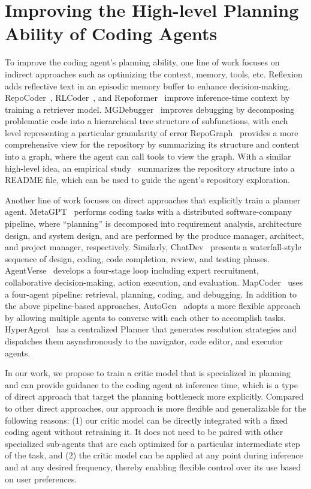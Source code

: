 \documentclass[12pt,openany]{cmuthesis}
\begin{document}
\section{Improving the High-level Planning Ability of Coding Agents}
\label{sec:related-critique}

To improve the coding agent's planning ability, one line of work focuses on indirect approaches such as optimizing the context, memory, tools, etc.
Reflexion~\cite{reflexion} adds reflective text in an episodic memory buffer to enhance decision-making.
RepoCoder~\cite{repocoder}, RLCoder~\cite{rlcoder}, and Repoformer~\cite{repoformer} improve inference-time context by training a retriever model.
MGDebugger~\cite{mgdebugger} improves debugging by decomposing problematic code into a hierarchical tree structure of subfunctions, with each level representing a particular granularity of error
RepoGraph~\cite{repograph} provides a more comprehensive view for the repository by summarizing its structure and content into a graph, where the agent can call tools to view the graph.
With a similar high-level idea, an empirical study~\cite{strong-weak} summarizes the repository structure into a README file, which can be used to guide the agent's repository exploration.


Another line of work focuses on direct approaches that explicitly train a planner agent.
MetaGPT~\cite{metagpt} performs coding tasks with a distributed software-company pipeline, where ``planning'' is decomposed into requirement analysis, architecture design, and system design, and are performed by the produce manager, architect, and project manager, respectively.
Similarly, ChatDev~\cite{chatdev} presents a waterfall-style sequence of design, coding, code completion, review, and testing phases.
AgentVerse~\cite{agentverse} develops a four-stage loop including expert recruitment, collaborative decision-making, action execution, and evaluation.
MapCoder~\cite{mapcoder} uses a four-agent pipeline: retrieval, planning, coding, and debugging. 
In addition to the above pipeline-based approaches, AutoGen~\cite{autogen} adopts a more flexible approach by allowing multiple agents to converse with each other to accomplish tasks.
HyperAgent~\cite{hyperagent} has a centralized Planner that generates resolution strategies and dispatches them asynchronously to the navigator, code editor, and executor agents.

In our work, we propose to train a critic model that is specialized in planning and can provide guidance to the coding agent at inference time, which is a type of direct approach that target the planning bottleneck more explicitly.
Compared to other direct approaches, our approach is more flexible and generalizable for the following reasons:
(1) our critic model can be directly integrated with a fixed coding agent without retraining it. It does not need to be paired with other specialized sub-agents that are each optimized for a particular intermediate step of the task, and
(2) the critic model can be applied at any point during inference and at any desired frequency, thereby enabling flexible control over its use based on user preferences.
\end{document}

